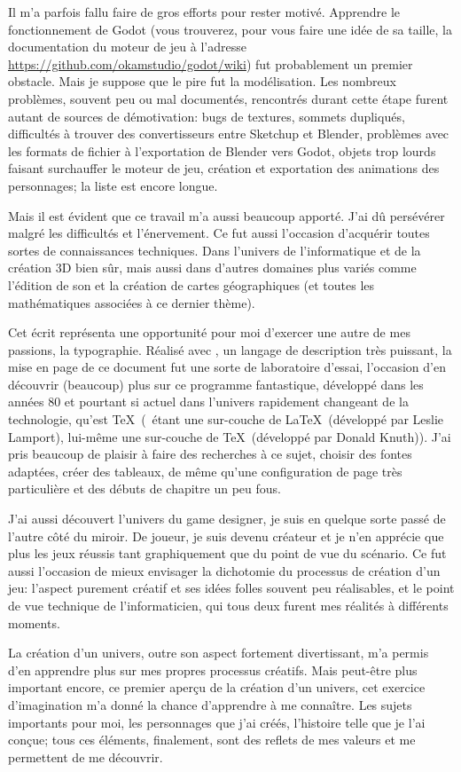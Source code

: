 Il m'a parfois fallu faire de gros efforts pour rester motivé. Apprendre le fonctionnement de Godot (vous trouverez, pour vous faire une idée de sa taille, la documentation du moteur de jeu à l'adresse \url{https://github.com/okamstudio/godot/wiki}) fut probablement un premier obstacle. Mais je suppose que le pire fut la modélisation. Les nombreux problèmes, souvent peu ou mal documentés, rencontrés durant cette étape furent autant de sources de démotivation: bugs de textures, sommets dupliqués, difficultés à trouver des convertisseurs entre Sketchup et Blender, problèmes avec les formats de fichier à l'exportation de Blender vers Godot, objets trop lourds faisant surchauffer le moteur de jeu, création et exportation des animations des personnages; la liste est encore longue.

Mais il est évident que ce travail m'a aussi beaucoup apporté. J'ai dû persévérer malgré les difficultés et l'énervement. Ce fut aussi l'occasion d'acquérir toutes sortes de connaissances techniques. Dans l'univers de l'informatique et de la création 3D bien sûr, mais aussi dans d'autres domaines plus variés comme l'édition de son et la création de cartes géographiques (et toutes les mathématiques associées à ce dernier thème).

Cet écrit représenta une opportunité pour moi d'exercer une autre de mes passions, la typographie. Réalisé avec \XeLaTeX, un langage de description très puissant, la mise en page de ce document fut une sorte de laboratoire d'essai, l'occasion d'en découvrir (beaucoup) plus sur ce programme fantastique, développé dans les années 80 et pourtant si actuel dans l'univers rapidement changeant de la technologie, qu'est \TeX\ (\XeLaTeX\ étant une sur-couche de \LaTeX\ (développé par Leslie Lamport), lui-même une sur-couche de \TeX\ (développé par Donald Knuth)). J'ai pris beaucoup de plaisir à faire des recherches à ce sujet, choisir des fontes adaptées, créer des tableaux, de même qu'une configuration de page très particulière et des débuts de chapitre un peu fous.

J'ai aussi découvert l'univers du game designer, je suis en quelque sorte passé de l'autre côté du miroir. De joueur, je suis devenu créateur et je n'en apprécie que plus les jeux réussis tant graphiquement que du point de vue du scénario. Ce fut aussi l'occasion de mieux envisager la dichotomie du processus de création d'un jeu: l'aspect purement créatif et ses idées folles souvent peu réalisables, et le point de vue technique de l'informaticien, qui tous deux furent mes réalités à différents moments.

La création d'un univers, outre son aspect fortement divertissant, m'a permis d'en apprendre plus sur mes propres processus créatifs. Mais peut-être plus important encore, ce premier aperçu de la création d'un univers, cet exercice d'imagination m'a donné la chance d'apprendre à me connaître. Les sujets importants pour moi, les personnages que j'ai créés, l'histoire telle que je l'ai conçue; tous ces éléments, finalement, sont des reflets de mes valeurs et me permettent de me découvrir.
